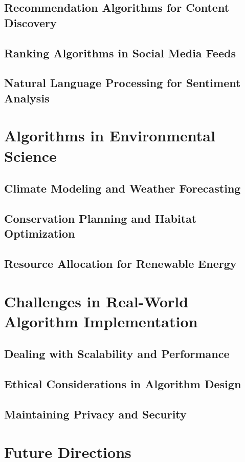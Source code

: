 \documentclass[12pt]{book} %
\begin{document}
\subsection{Recommendation Algorithms for Content Discovery}
\subsection{Ranking Algorithms in Social Media Feeds}
\subsection{Natural Language Processing for Sentiment Analysis}

\section{Algorithms in Environmental Science}
\subsection{Climate Modeling and Weather Forecasting}
\subsection{Conservation Planning and Habitat Optimization}
\subsection{Resource Allocation for Renewable Energy}

\section{Challenges in Real-World Algorithm Implementation}
\subsection{Dealing with Scalability and Performance}
\subsection{Ethical Considerations in Algorithm Design}
\subsection{Maintaining Privacy and Security}

\section{Future Directions}
\end{document}
